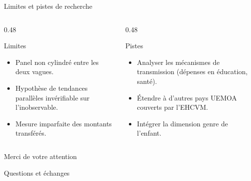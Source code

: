 \documentclass[10pt,aspectratio=169]{beamer}
\begin{document}
\begin{frame}{Limites et pistes de recherche}
  \begin{columns}[T]
    \begin{column}{0.48\textwidth}
      \begin{alertblock}{Limites}
        \begin{itemize}
          \item Panel non cylindré entre les deux vagues.
          \item Hypothèse de tendances parallèles invérifiable sur l'inobservable.
          \item Mesure imparfaite des montants transférés.
        \end{itemize}
      \end{alertblock}
    \end{column}
    \begin{column}{0.48\textwidth}
      \begin{block}{Pistes}
        \begin{itemize}
          \item Analyser les mécanismes de transmission (dépenses en éducation, santé).
          \item Étendre à d'autres pays UEMOA couverts par l'EHCVM.
          \item Intégrer la dimension genre de l'enfant.
        \end{itemize}
      \end{block}
    \end{column}
  \end{columns}
\end{frame}


\begin{frame}
  \begin{center}
    \Huge Merci de votre attention
    \vspace{0.6cm}

    \large Questions et échanges
  \end{center}
\end{frame}
\end{document}
